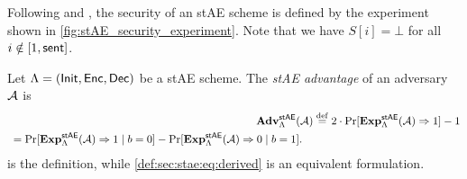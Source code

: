 Following \cite{AC:PatRisShr11} and \cite{C:JKSS12},
the security of an stAE scheme is defined by the experiment shown in \cref{fig:stAE_security_experiment}.
Note that we have $S[i] = \bot$ for all $i \notin [1, \mathsf{sent}]$.

\begin{definition}\label{def:stae:security}
Let $\Lambda = (\mathsf{Init}, \mathsf{Enc}, \mathsf{Dec})$ be a stAE scheme. 
The \emph{stAE advantage} of an adversary $\mathcal{A}$ is 
\begin{align}
	\mathbf{Adv}_{\Lambda}^{\mathsf{stAE}}(\mathcal{A}) 
		&\overset{\mathrm{def}}{=} 2 \cdot \Pr[ \mathbf{Exp}_{\Lambda}^{\mathsf{stAE}}(\mathcal{A}) \Rightarrow 1] - 1 \label{def:sec:stae:eq:definition}  \\ 
		\begin{split}
			&\hspace*{1.6pt}= \Pr[ \mathbf{Exp}_{\Lambda}^{\mathsf{stAE}}(\mathcal{A}) \Rightarrow 1 \mid b = 0] 
				 - \Pr[ \mathbf{Exp}_{\Lambda}^{\mathsf{stAE}}(\mathcal{A}) \Rightarrow 0 \mid b = 1] . \label{def:sec:stae:eq:derived}
		\end{split}
\end{align}
 is the definition,
while \eqref{def:sec:stae:eq:derived} is an equivalent formulation.
\end{definition}



